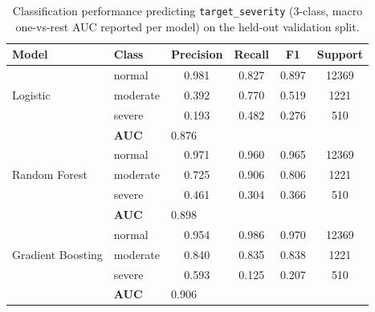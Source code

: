 \begin{table}[h]
\centering
\begin{tabular}{llcccc}
\toprule
Model & Class & Precision & Recall & F1 & Support \\
\midrule
\multirow{3}{*}{Logistic} & normal & 0.981 & 0.827 & 0.897 & 12369 \\
 & moderate & 0.392 & 0.770 & 0.519 & 1221 \\
 & severe & 0.193 & 0.482 & 0.276 & 510 \\
& \textbf{AUC} & \multicolumn{4}{l}{0.876} \\
\midrule
\multirow{3}{*}{Random Forest} & normal & 0.971 & 0.960 & 0.965 & 12369 \\
 & moderate & 0.725 & 0.906 & 0.806 & 1221 \\
 & severe & 0.461 & 0.304 & 0.366 & 510 \\
& \textbf{AUC} & \multicolumn{4}{l}{0.898} \\
\midrule
\multirow{3}{*}{Gradient Boosting} & normal & 0.954 & 0.986 & 0.970 & 12369 \\
 & moderate & 0.840 & 0.835 & 0.838 & 1221 \\
 & severe & 0.593 & 0.125 & 0.207 & 510 \\
& \textbf{AUC} & \multicolumn{4}{l}{0.906} \\
\bottomrule
\end{tabular}
\caption{Classification performance predicting \texttt{target\_severity} (3-class, macro one-vs-rest AUC reported per model) on the held-out validation split.}
\label{tab:classification_results}
\end{table}
